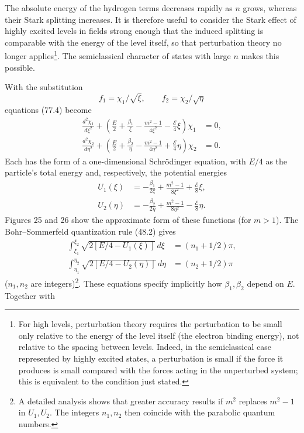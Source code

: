 The absolute energy of the hydrogen terms decreases rapidly as $n$ grows, whereas their Stark splitting increases. It is therefore useful to consider the Stark effect of highly excited levels in fields strong enough that the induced splitting is comparable with the energy of the level itself, so that perturbation theory no longer applies\footnote{For high levels, perturbation theory requires the perturbation to be small only relative to the energy of the level itself (the electron binding energy), not relative to the spacing between levels. Indeed, in the semiclassical case represented by highly excited states, a perturbation is small if the force it produces is small compared with the forces acting in the unperturbed system; this is equivalent to the condition just stated.}. The semiclassical character of states with large $n$ makes this possible.

With the substitution
\begin{equation}
 f_1=\chi_1/\sqrt\xi,\qquad f_2=\chi_2/\sqrt\eta
 \tag{77.10}
\end{equation}
equations (77.4) become
\begin{align}
 \frac{d^2\chi_1}{d\xi^2}+\left(\frac E2+\frac{\beta_1}{\xi}-\frac{m^2-1}{4\xi^2}-\frac{\mathcal E}{4}\xi\right)\chi_1&=0,\nonumber\\
 \frac{d^2\chi_2}{d\eta^2}+\left(\frac E2+\frac{\beta_2}{\eta}-\frac{m^2-1}{4\eta^2}+\frac{\mathcal E}{4}\eta\right)\chi_2&=0.
 \tag{77.11}
\end{align}
Each has the form of a one-dimensional Schrödinger equation, with $E/4$ as the particle's total energy and, respectively, the potential energies
\begin{align}
 U_1(\xi)&=-\frac{\beta_1}{2\xi}+\frac{m^2-1}{8\xi^2}+\frac{\mathcal E}{8}\xi,\nonumber\\
 U_2(\eta)&=-\frac{\beta_2}{2\eta}+\frac{m^2-1}{8\eta^2}-\frac{\mathcal E}{8}\eta.
 \tag{77.12}
\end{align}
Figures 25 and 26 show the approximate form of these functions (for $m>1$). The Bohr--Sommerfeld quantization rule (48.2) gives
\begin{align}
 \int_{\xi_1}^{\xi_2}\sqrt{2[E/4-U_1(\xi)]}\,d\xi&=(n_1+1/2)\pi,\nonumber\\
 \int_{\eta_1}^{\eta_2}\sqrt{2[E/4-U_2(\eta)]}\,d\eta&=(n_2+1/2)\pi
 \tag{77.13}
\end{align}
($n_1,n_2$ are integers)\footnote{A detailed analysis shows that greater accuracy results if $m^2$ replaces $m^2-1$ in $U_1,U_2$. The integers $n_1,n_2$ then coincide with the parabolic quantum numbers.}. These equations specify implicitly how $\beta_1,\beta_2$ depend on $E$. Together with

